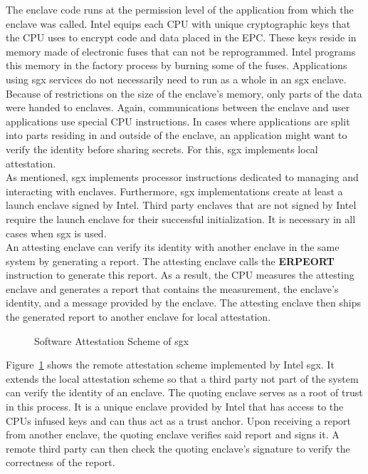 The enclave code runs at the permission level of the application from which the
enclave was called. Intel equips each CPU with unique cryptographic keys that
the CPU uses to encrypt code and data placed in the EPC. These keys reside in
memory made of electronic fuses that can not be reprogrammed. Intel programs
this memory in the factory process by burning some of the fuses. Applications
using \gls{sgx} services do not necessarily need to run as a whole in an
\gls{sgx} enclave. Because of restrictions on the size of the enclave's memory,
only parts of the data were handed to enclaves. Again, communications between
the enclave and user applications use special CPU instructions. In cases where
applications are split into parts residing in and outside of the enclave, an
application might want to verify the identity before sharing secrets. For this,
\gls{sgx} implements local attestation.\\

As mentioned, \gls{sgx} implements processor instructions dedicated to managing
and interacting with enclaves. Furthermore, \gls{sgx} implementations create at
least a launch enclave signed by Intel. Third party enclaves that are not signed
by Intel require the launch enclave for their successful initialization. It is
necessary in all cases when \gls{sgx} is used.\\

An attesting enclave can verify its identity with another enclave in the same
system by generating a report. The attesting enclave calls the \textbf{ERPEORT}
instruction to generate this report. As a result, the CPU measures the attesting
enclave and generates a report that contains the measurement, the enclave's
identity, and a message provided by the enclave. The attesting enclave then
ships the generated report to another enclave for local attestation.
\begin{center}
  \begin{figure}
    \centering
    
    \caption{Software Attestation Scheme of \gls{sgx}}
    \label{fig:state:tee:sgx_attestation}
  \end{figure}
\end{center}
Figure~\ref{fig:state:tee:sgx_attestation} shows the remote attestation scheme
implemented by Intel \gls{sgx}. It extends the local attestation scheme so that
a third party not part of the system can verify the identity of an enclave. The
quoting enclave serves as a root of trust in this process. It is a unique
enclave provided by Intel that has access to the CPUs infused keys and can thus
act as a trust anchor. Upon receiving a report from another enclave, the quoting
enclave verifies said report and signs it. A remote third party can then check
the quoting enclave's signature to verify the correctness of the report.

